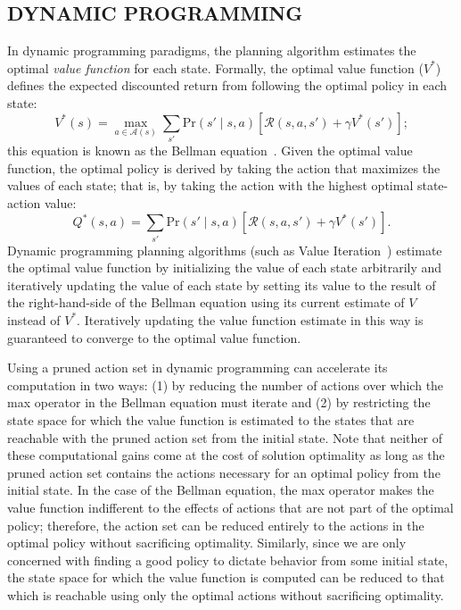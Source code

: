 \documentclass[]{article}
\newcommand{\stnote}[1]{\textcolor{Blue}{\textbf{ST: #1}}}
\newcommand{\dnote}[1]{\textcolor{Orange}{\textbf{D: #1}}}
\begin{document}
\subsection{DYNAMIC PROGRAMMING}
In dynamic programming paradigms, the planning algorithm estimates the
optimal {\em value function} for each state. Formally, the optimal
value function ($V^*$) defines the expected discounted return from
following the optimal policy in each state:
\begin{equation}
\label{eq:bellman}
V^*(s) = \max_{a \in \mathcal{A}(s)} \sum_{s'} \text{Pr}(s' \mid s, a)\left[\mathcal{R}(s,a,s') + \gamma V^*(s') \right];
\end{equation}
this equation is known as the Bellman
equation~\citep{bellman57}. Given the optimal value function, the
optimal policy is derived by taking the action that maximizes the
values of each state; that is, by taking the action with the
highest optimal state-action value:
\begin{equation}
\label{eq:qvalue}
Q^*(s,a) = \sum_{s'} \text{Pr}(s' \mid s, a)\left[\mathcal{R}(s,a,s') + \gamma V^*(s') \right].
\end{equation}
Dynamic programming planning algorithms (such as Value
Iteration~\citep{bellman57}) estimate the optimal value function by
initializing the value of each state arbitrarily and iteratively
updating the value of each state by setting its value to the result of
the right-hand-side of the Bellman equation using its current estimate
of $V$ instead of $V^*$. Iteratively updating the value function
estimate in this way is guaranteed to converge to the optimal value
function.

Using a pruned action set in dynamic programming can accelerate its
computation in two ways: (1) by reducing the number of actions over
which the max operator in the Bellman equation must iterate and (2) by
restricting the state space for which the value function is estimated
to the states that are reachable with the pruned action set from the
initial state. Note that neither of these computational gains come at
the cost of solution optimality as long as the pruned action set
contains the actions necessary for an optimal policy from the initial
state. In the case of the Bellman equation, the max operator makes the
value function indifferent to the effects of actions that are not part
of the optimal policy; therefore, the action set can be reduced
entirely to the actions in the optimal policy without sacrificing
optimality. Similarly, since we are only concerned with finding a good
policy to dictate behavior from some initial state, the state space
for which the value function is computed can be reduced to that which
is reachable using only the optimal actions without sacrificing
optimality.  
\end{document}
